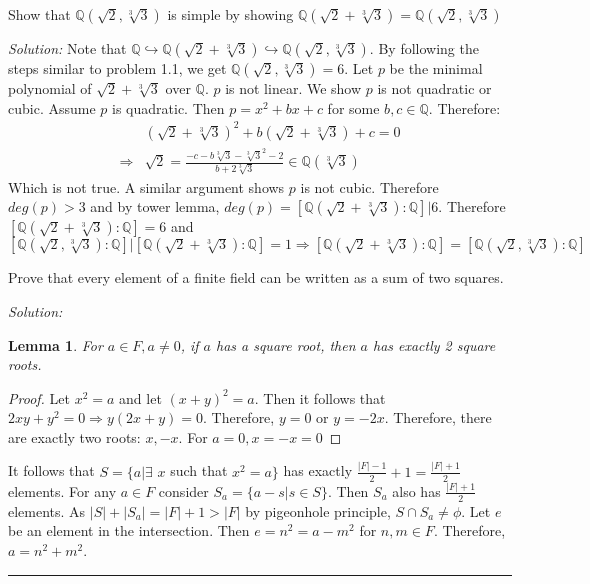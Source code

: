 \documentclass[a4paper, 11pt]{article}
\newenvironment{solution}
    {\textit{Solution:}}
    {}
\newtheorem{lemma}[theorem]{Lemma}
\begin{document}
\begin{tcolorbox}[colback=c2,colframe=c1,title=Problem 4.7]
    Show that $\mathbb Q(\sqrt 2,\sqrt[3]3)$ is simple by showing $\mathbb Q(\sqrt 2+\sqrt[3]3)=\mathbb Q(\sqrt 2,\sqrt[3]3)$
\end{tcolorbox}
\begin{solution}
   Note that $\mathbb{Q}\hookrightarrow\mathbb Q(\sqrt 2+\sqrt[3]3)\hookrightarrow\mathbb Q(\sqrt 2,\sqrt[3]3)$. By following the steps similar to problem 1.1, we get $\mathbb Q(\sqrt 2,\sqrt[3]3)=6$. Let $p$ be the minimal polynomial of $\sqrt2+\sqrt[3]3$ over $\mathbb{Q}$. $p$ is not linear. We show $p$ is not quadratic or cubic. Assume $p$ is quadratic. Then $p=x^2+bx+c$ for some $b,c\in\mathbb Q$. Therefore:
   \begin{align*}
    &(\sqrt2+\sqrt[3]3)^2+b(\sqrt2+\sqrt[3]3)+c=0\\
    \Rightarrow& \sqrt{2}=\frac{-c-b\sqrt[3]{3}-\sqrt[3]{3}^2-2}{b+2\sqrt[3]{3}}\in\mathbb{Q}(\sqrt[3]{3})
   \end{align*}
   Which is not true. A similar argument shows $p$ is not cubic. Therefore $deg(p)>3$ and by tower lemma, $deg(p)=[\mathbb Q(\sqrt 2+\sqrt[3]3):\mathbb{Q}]|6$. Therefore $[\mathbb Q(\sqrt 2+\sqrt[3]3):\mathbb{Q}]=6$ and $[\mathbb Q(\sqrt 2,\sqrt[3]3):\mathbb{Q}]|[\mathbb Q(\sqrt 2+\sqrt[3]3):\mathbb{Q}]=1\Rightarrow [\mathbb Q(\sqrt 2+\sqrt[3]3):\mathbb{Q}]=[\mathbb Q(\sqrt 2,\sqrt[3]3):\mathbb{Q}]$
\end{solution}


\begin{tcolorbox}[colback=c2,colframe=c1,title=Problem 4.8]
    Prove that every element of a finite field can be written as a sum of two
    squares.
\end{tcolorbox}
\begin{solution}
    \begin{lemma}
        For $a\in F,a\ne 0$, if $a$ has a square root, then $a$ has exactly 2 square roots. 
    \end{lemma}
    \begin{proof}
        Let $x^2=a$ and let $(x+y)^2=a$. Then it follows that $2xy+y^2=0\Rightarrow y(2x+y)=0$. Therefore, $y=0$ or $y=-2x$. Therefore, there are exactly two roots: $x,-x$. For $a=0,x=-x=0$
    \end{proof}\noindent
    It follows that $S=\{a|\exists$ $x$ such that $x^2=a\}$ has exactly $\frac{|F|-1}{2}+1=\frac{|F|+1}{2}$ elements. For any $a\in F$ consider $S_a=\{a-s|s\in S\}$. Then $S_a$ also has  $\frac{|F|+1}{2}$ elements. As $|S|+|S_a|=|F|+1>|F|$ by pigeonhole principle, $S\cap S_a\ne\phi$. Let $e$ be an element in the intersection. Then $e=n^2=a-m^2$ for $n,m\in F$. Therefore, $a=n^2+m^2$. 
\end{solution}





\noindent\rule{7in}{2.8pt}
\end{document}
